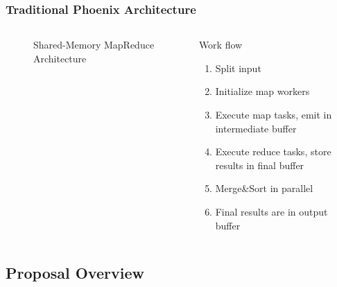 \begin{frame}
	\frametitle{Traditional Phoenix Architecture}
	\begin{columns}[c]
	\begin{figure}[h]
		\hspace{-12pt}	
		\caption*{Shared-Memory MapReduce Architecture	\footnotemark}
	\end{figure}
	
	\begin{block}{Work flow}
	\begin{enumerate}
		\item Split input
		\item Initialize map workers
		\item Execute map tasks, emit in intermediate buffer
		\item Execute reduce tasks, store results in final buffer
		\item Merge\&Sort in parallel
		\item Final results are in output buffer
	\end{enumerate}
	\end{block}
	\end{columns}
\end{frame}

\subsection{Proposal Overview}

